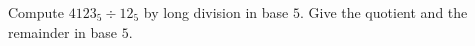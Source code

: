 Compute $4123_5\div12_5$ by long division in base $5$. Give the quotient and the remainder in base $5$.

